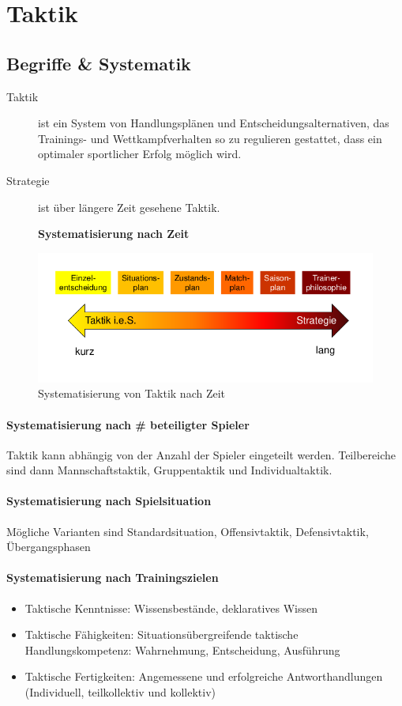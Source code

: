 \section{Taktik}

\subsection{Begriffe \& Systematik}
\begin{description}
  \item[Taktik] ist ein System von Handlungsplänen und Entscheidungsalternativen, das Trainings- und Wettkampfverhalten so zu regulieren gestattet, dass ein optimaler sportlicher Erfolg möglich wird.
  \item[Strategie] ist über längere Zeit gesehene Taktik.
\end{description}
\begin{figure}[H]
  \begin{flushleft}
    \textbf{Systematisierung nach Zeit}
  \end{flushleft}
  \centering
  \includegraphics[width=.7\textwidth]{pictures/taktik_systematisierung.png}
  \caption{Systematisierung von Taktik nach Zeit}
\end{figure}
\paragraph{Systematisierung nach \# beteiligter Spieler} Taktik kann abhängig von der Anzahl der Spieler eingeteilt werden. Teilbereiche sind dann Mannschaftstaktik, Gruppentaktik und Individualtaktik.
\paragraph{Systematisierung nach Spielsituation} Mögliche Varianten sind Standardsituation, Offensivtaktik, Defensivtaktik, Übergangsphasen
\paragraph{Systematisierung nach Trainingszielen}
\begin{itemize}
  \item Taktische Kenntnisse: Wissensbestände, deklaratives Wissen
  \item Taktische Fähigkeiten: Situationsübergreifende taktische Handlungskompetenz: Wahrnehmung, Entscheidung, Ausführung
  \item Taktische Fertigkeiten: Angemessene und erfolgreiche Antworthandlungen (Individuell, teilkollektiv und kollektiv)
\end{itemize}
